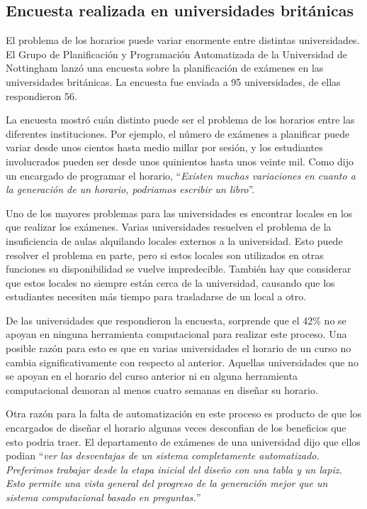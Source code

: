 \subsection{Encuesta realizada en universidades británicas}

El problema de los horarios puede variar enormente entre distintas universidades. El Grupo de Planificación
y Programación Automatizada de la Universidad de Nottingham lanzó una encuesta \cite{survey of University of Nottingham} sobre la planificación de exámenes en las universidades británicas. La encuesta fue enviada a
95 universidades, de ellas respondieron 56.

La encuesta mostró cuán distinto puede ser el problema de los horarios entre las diferentes instituciones.
Por ejemplo, el número de exámenes a planificar puede variar desde unos cientos hasta medio millar por sesión,
y los estudiantes involucrados pueden ser desde unos quinientos hasta unos veinte mil. Como dijo un
encargado de programar el horario, ``\emph{Existen muchas variaciones en cuanto a la generación de un horario,
podriamos escribir un libro}''.

Uno de los mayores problemas para las universidades es encontrar locales en los que realizar los exámenes.
Varias universidades resuelven el problema de la insuficiencia de aulas alquilando locales externos a la
universidad. Esto puede resolver el problema en parte, pero si estos locales son utilizados en otras funciones
su disponibilidad se vuelve impredecible. También hay que considerar que estos locales no siempre están cerca de
la universidad, causando que los estudiantes necesiten más tiempo para trasladarse de un local a otro.

De las universidades que respondieron la encuesta, sorprende que el 42\% no se apoyan en ninguna herramienta
computacional para realizar este proceso. Una posible razón para esto es que en varias universidades el
horario de un curso no cambia significativamente con respecto al anterior. Aquellas universidades que no
se apoyan en el horario del curso anterior ni en alguna herramienta computacional demoran al menos cuatro
semanas en diseñar su horario.

Otra razón para la falta de automatización en este proceso es producto de que los encargados de diseñar el horario
algunas veces desconfian de los beneficios que esto podria traer. El departamento de exámenes de una universidad
dijo que ellos podian ``\emph{ver las desventajas de un sistema completamente automatizado. Preferimos trabajar
desde la etapa inicial del diseño con una tabla y un lapiz. Esto permite una vista general del progreso de la
generación mejor que un sistema computacional basado en preguntas.}''

